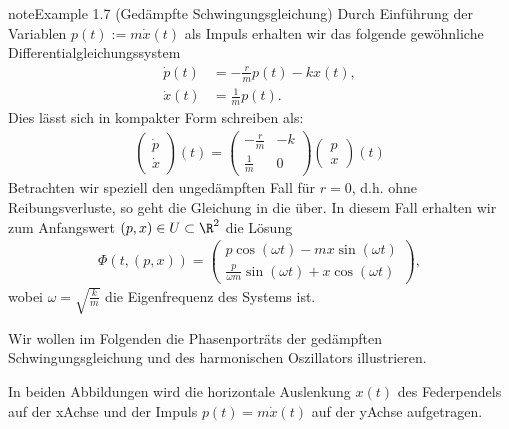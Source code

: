 \documentclass[letterpaper,10pt,english]{jupyterBook}
\begin{document}
\begin{sphinxadmonition}{note}{Example 1.7 (Gedämpfte Schwingungsgleichung)}
\sphinxAtStartPar
Durch Einführung der Variablen \(p(t):= m\dot{x}(t)\) als Impuls erhalten wir das folgende gewöhnliche Differentialgleichungssystem
\begin{equation*}
\begin{split}\dot{p}(t) &= - \frac{r}{m}p(t) -kx(t), \\
\dot{x}(t) &= \frac{1}{m}p(t).\end{split}
\end{equation*}
\sphinxAtStartPar
Dies lässt sich in kompakter Form schreiben als:
\begin{equation*}
\begin{split}\begin{pmatrix} \dot{p} \\ \dot{x} \end{pmatrix}(t) = \begin{pmatrix} -\frac{r}{m} & -k \\ \frac{1}{m} & 0\end{pmatrix} \begin{pmatrix}p \\ x\end{pmatrix}(t)\end{split}
\end{equation*}
\sphinxAtStartPar
Betrachten wir speziell den ungedämpften Fall für \(r=0\), d.h. ohne Reibungsverluste, so geht die Gleichung in die  über.
In diesem Fall erhalten wir zum Anfangswert \((p,x) \in U \subset \R^2 \) die Lösung
\begin{equation*}
\begin{split}\Phi(t, (p,x)) = 
\begin{pmatrix}
p \cos(\omega t) - m x \sin(\omega t) \\
\frac{p}{\omega m}\sin(\omega t) + x\cos(\omega t)
\end{pmatrix},\end{split}
\end{equation*}
\sphinxAtStartPar
wobei \(\omega=\sqrt{\frac{k}{m}}\) die Eigenfrequenz des Systems ist.
\end{sphinxadmonition}

\sphinxAtStartPar
Wir wollen im Folgenden die Phasenporträts der gedämpften Schwingungsgleichung und des harmonischen Oszillators illustrieren.

\sphinxAtStartPar
In beiden Abbildungen wird die horizontale Auslenkung \(x(t)\) des Federpendels auf der x\sphinxhyphen{}Achse und der Impuls \(p(t) = m\dot{x}(t)\) auf der y\sphinxhyphen{}Achse aufgetragen.
\end{document}

